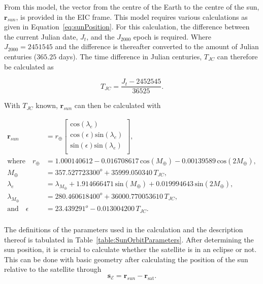 From this model, the vector from the centre of the Earth to the centre of the sun, $\mathbf{r}_{sun}$, is provided in the EIC frame. This model requires various calculations as given in Equation~\ref{eq:sunPosition}. For this calculation, the difference between the current Julian date, $J_t$, and the $J_{2000}$ epoch is required. Where $J_{2000} = \num{2451545}$ and the difference is thereafter converted to the amount of Julian centuries ($\num{365.25}$ days). The time difference in Julian centuries, $T_{JC}$ can therefore be calculated as 

\begin{equation}
T_{JC} = \frac{J_t - \num{2452545}}{\num{36525}}.
\end{equation}

With $T_{JC}$ known, $\mathbf{r}_{sun}$ can then be calculated with

\begin{equation}
\label{eq:sunPosition}
	\begin{aligned}
		\mathbf{r}_{sun} &= r_{\oplus} \begin{bmatrix}
		\text{cos}(\lambda_e) \\ \text{cos}(\epsilon)\text{sin}(\lambda_e) \\ \text{sin}(\epsilon)\text{sin}(\lambda_e) \\
		\end{bmatrix}, \\
		\text{where} \quad r_{\oplus} &= \num{1.000140612} - \num{0.016708617} \, \text{cos}(M_{\oplus}) - \num{0.00139589} \, \text{cos}(2M_{\oplus}), \\
		M_{\oplus} &= \num{357.527723300}^o + \num{35999.050340} \, T_{JC}, \\
		\lambda_e &= \lambda_{M_{\oplus}} + \num{1.914666471} \, \text{sin}(M_{\oplus}) + \num{0.019994643} \, \text{sin}(2M_{\oplus}), \\
		\lambda_{M_{\oplus}} &= \num{280.460618400}^o + \num{36000.770053610} \, T_{JC}, \\
		\text{and} \quad \epsilon &= \num{23.439291}^o - \num{0.013004200} \, T_{JC}. \\
	\end{aligned}
\end{equation}

The definitions of the parameters used in the calculation and the description thereof is tabulated in Table~\ref{table:SunOrbitParameters}. After determining the sun position, it is crucial to calculate whether the satellite is in an eclipse or not. This can be done with basic geometry after calculating the position of the sun relative to the satellite through
\begin{equation}
\mathbf{s}_{\mathcal{E}} = \mathbf{r}_{sun} - \mathbf{r}_{\text{sat}}.
\end{equation}


